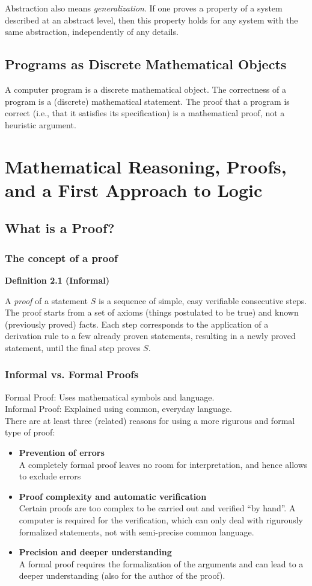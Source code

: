 \documentclass[a4paper]{report}
\newenvironment{definition}[1]{\begin{framed}\centerline{\textbf{Definition #1}}\noindent\hspace{-1.1mm}}{\end{framed}}
\begin{document}
Abstraction also means \emph{generalization}. If one proves a property of a system described at an abstract level, then this property holds for any system with the same abstraction, independently of any details. 

\section{Programs as Discrete Mathematical Objects}
A computer program is a discrete mathematical object. The correctness of a program is a (discrete) mathematical statement. The proof that a program is correct (i.e., that it satisfies its specification) is a mathematical proof, not a heuristic argument. 

\chapter{Mathematical Reasoning, Proofs, and a First Approach to Logic} 
\section{What is a Proof?}
\setcounter{subsection}{1}
\subsection{The concept of a proof}
\begin{definition}{2.1 (Informal)} 
A \emph{proof} of a statement $S$ is a sequence of simple, easy verifiable consecutive steps. The proof starts from a set of axioms (things postulated to be true) and known (previously proved) facts. Each step corresponds to the application of a derivation rule to a few already proven statements, resulting in a newly proved statement, until the final step proves $S$.
\end{definition}
\subsection{Informal vs. Formal Proofs}
Formal Proof: Uses mathematical symbols and language.\\
Informal Proof: Explained using common, everyday language.\\

\noindent There are at least three (related) reasons for using a more rigurous and formal type of proof:
\begin{itemize}
\item \textbf{Prevention of errors}\\
A completely formal proof leaves no room for interpretation, and hence allows to exclude errors
\item \textbf{Proof complexity and automatic verification}\\
Certain proofs are too complex to be carried out and verified ``by hand''. A computer is required for the verification, which can only deal with rigurously formalized statements, not with semi-precise common language. 
\item\textbf{Precision and deeper understanding}\\
A formal proof requires the formalization of the arguments and can lead to a deeper understanding (also for the author of the proof).
\end{itemize}
\end{document}
